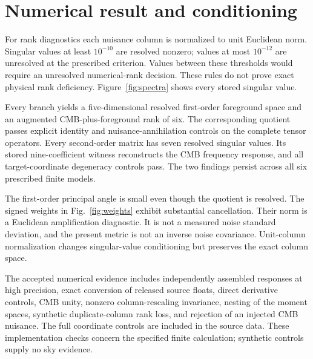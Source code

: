 \documentclass[aps,prd,preprint,nofootinbib,11pt]{revtex4-2}
\begin{document}
\section{Numerical result and conditioning}
For rank diagnostics each nuisance column is normalized to unit Euclidean norm. Singular values at least $10^{-10}$ are resolved nonzero; values at most $10^{-12}$ are unresolved at the prescribed criterion. Values between these thresholds would require an unresolved numerical-rank decision. These rules do not prove exact physical rank deficiency. Figure~\ref{fig:spectra} shows every stored singular value.

Every branch yields a five-dimensional resolved first-order foreground space and an augmented CMB-plus-foreground rank of six. The corresponding quotient passes explicit identity and nuisance-annihilation controls on the complete tensor operators. Every second-order matrix has seven resolved singular values. Its stored nine-coefficient witness reconstructs the CMB frequency response, and all target-coordinate degeneracy controls pass. The two findings persist across all six prescribed finite models.

\begin{table}[h]
\caption{Stored branch diagnostics. The label is the LFI convention followed by the HFI transmission threshold. Ranks are numerically resolved ranks $r_1/r_2$. Conditions $\kappa_j$ use unit-column matrices. $d_j=\sin\theta_j$ is the CMB-subspace principal-angle sine; $n_w=\|w\|_2$. The last column is the largest stored relative full-tensor degeneracy residual across target basis coordinates. The machine-readable companion also retains the spectral reconstruction residual.}
\label{tab:branches}
\end{table}
The first-order principal angle is small even though the quotient is resolved. The signed weights in Fig.~\ref{fig:weights} exhibit substantial cancellation. Their norm is a Euclidean amplification diagnostic. It is not a measured noise standard deviation, and the present metric is not an inverse noise covariance. Unit-column normalization changes singular-value conditioning but preserves the exact column space.

The accepted numerical evidence includes independently assembled responses at high precision, exact conversion of released source floats, direct derivative controls, CMB unity, nonzero column-rescaling invariance, nesting of the moment spaces, synthetic duplicate-column rank loss, and rejection of an injected CMB nuisance. The full coordinate controls are included in the source data. These implementation checks concern the specified finite calculation; synthetic controls supply no sky evidence.
\end{document}
